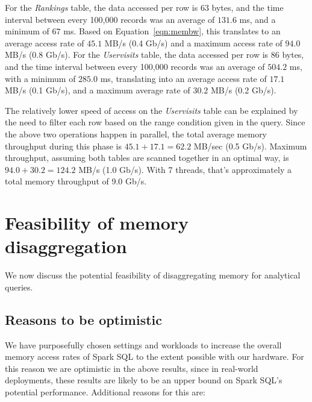 \documentclass{sig-alternate-05-2015}
\begin{document}
For the {\em Rankings} table, the data accessed per row is 63 bytes, and the
time interval between every 100,000 records was an average of
$131.6$ ms, and a minimum of $67$ ms.  Based on Equation~\ref{eqn:membw},
this translates to an average access rate of $45.1$ MB/s (0.4 Gb/s) and
a maximum access rate of $94.0$ MB/s (0.8 Gb/s).
For the {\em Uservisits} table, the data accessed per row is
86 bytes, and the time interval between every 100,000 records was
an average of $504.2$ ms, with a minimum of $285.0$ ms, translating
into an average access rate of $17.1$ MB/s (0.1 Gb/s),
and a maximum average rate of $30.2$ MB/s (0.2 Gb/s).

The relatively lower speed of access on the {\em Uservisits} table can be
explained by the need to filter each row based on the range condition given in
the query.  Since the above two operations happen in parallel, the total
average memory throughput during this phase is $45.1 + 17.1 = 62.2$ MB/sec
(0.5 Gb/s).  Maximum throughput, assuming both tables are scanned together in
an optimal way, is $94.0 + 30.2 = 124.2$ MB/s (1.0 Gb/s).  With 7 threads,
that's approximately a total memory throughput of 9.0 Gb/s.

\section{Feasibility of memory disaggregation}

We now discuss the potential feasibility of disaggregating memory
for analytical queries.

\subsection{Reasons to be optimistic}

We have purposefully chosen settings and workloads to increase the overall
memory access rates of Spark SQL to the extent possible with our hardware.  For
this reason we are optimistic in the above results, since in real-world
deployments, these results are likely to be an upper bound on Spark SQL's
potential performance.  Additional reasons for this are:
\end{document}
